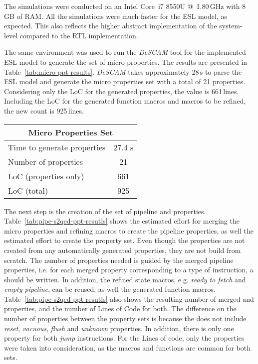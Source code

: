 The simulations were conducted on an Intel Core~i7 8550U @~1.80\,GHz with 8\,GB of RAM. All the simulations were much faster for the ESL model, as expected. This also reflects the higher abstract implementation of the system-level compared to the RTL implementation.

The same environment was used to run the \textit{DeSCAM} tool for the implemented ESL model to generate the set of micro properties. The results are presented in Table~\ref{tab:micro-ppt-results}. \textit{DeSCAM} takes approximately 28\,s to parse the ESL model and generate the micro properties set with a total of 21 properties. Considering only the LoC for the generated properties, the value is 661\,lines. Including the LoC for the generated function macros and macros to be refined, the new count is 925\,lines.

\begin{table*}[htb!] 
	\centering 
	\caption{Results for micro properties generated by \textit{DeSCAM} from the RI5CY ESL model.} 
	\label{tab:micro-ppt-results}
	\begin{tabular}{p{6cm} c } 
		\multicolumn{2}{c}{\textbf{Micro Properties Set}} \\  
		\hline	
		Time to generate properties  &  27.4 s  \\
		Number of properties  &  21 \\
		LoC (properties only)  &  661 \\
		LoC (total)  &  925\\
	\end{tabular} 
\end{table*}

The next step is the creation of the set of pipeline and \SSQED{} properties. Table~\ref{tab:pipe-s2qed-ppt-resutls} shows the estimated effort for merging the micro properties and refining macros to create the pipeline properties, as well the estimated effort to create the \SSQED{} property set. Even though the \SSQED{} properties are not created from any automatically generated properties, they are not build from scratch. The number of properties needed is guided by the merged pipeline properties, i.e. for each merged property corresponding to a type of instruction, a \SSQED{} should be written. In addition, the refined state macros, e.g. \textit{ready to fetch} and \textit{empty pipeline}, can be reused, as well the generated function macros. Table~\ref{tab:pipe-s2qed-ppt-resutls} also shows the resulting number of merged and \SSQED{} properties, and the number of Lines of Code for both. The difference on the number of properties between the property sets is because the \SSQED{} does not include \textit{reset}, \textit{vacuous}, \textit{flush} and \textit{unknown} properties. In addition, there is only one \SSQED{} property for both \textit{jump} instructions. For the Lines of code, only the properties were taken into consideration, as the macros and functions are common for both sets. 

